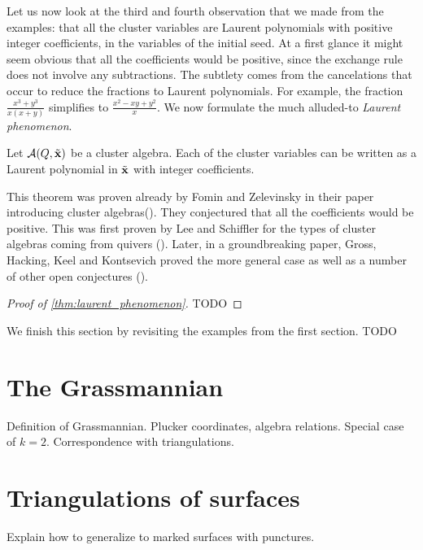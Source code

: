 Let us now look at the third and fourth observation that we made from the examples:
that all the cluster variables are Laurent polynomials with positive integer
coefficients, in the variables of the initial seed. At a first glance it might seem
obvious that all the coefficients would be positive, since the exchange rule does not
involve any subtractions. The subtlety comes from the cancelations that occur to reduce
the fractions to Laurent polynomials. For example, the fraction $\frac{x^3 +
		y^3}{x(x+y)}$ simplifies to $\frac{x^2 - xy + y^2}{x}$. We now formulate the much
alluded-to \emph{Laurent phenomenon}.
\begin{theorem}\label{thm:laurent_phenomenon}
	Let $\mathcal{A} (Q, \tilde{\mathbf{x}})$ be a cluster algebra. Each of the cluster variables can be written as a Laurent polynomial in $\tilde{\mathbf{x}}$ with integer coefficients.
\end{theorem}
This theorem was proven already by Fomin and Zelevinsky in their paper introducing cluster algebras(\cite[Theorem 3.1]{FominZelevinsky2002CAF}). They conjectured that all the coefficients would be positive. This was first proven by Lee and Schiffler for the types of cluster algebras coming from quivers (\cite{LeeSchiffler2015PositivityCA}). Later, in a groundbreaking paper, Gross, Hacking, Keel and Kontsevich proved the more general case as well as a number of other open conjectures (\cite{GrossHackingKeelKontsevich2018CanonicalBCA}).

\begin{proof}[Proof of \cref{thm:laurent_phenomenon}]
	TODO
\end{proof}

We finish this section by revisiting the examples from the first section. TODO

\section{The Grassmannian}
Definition of Grassmannian. Plucker coordinates, algebra relations. Special case of
$k=2$. Correspondence with triangulations.
\section{Triangulations of surfaces}
Explain how to generalize to marked surfaces with punctures.
